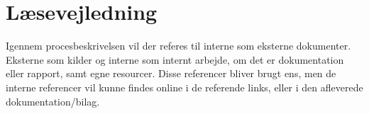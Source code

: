 \section{Læsevejledning}

Igennem procesbeskrivelsen vil der referes til interne som eksterne dokumenter. Eksterne som kilder og interne som internt arbejde, om det er dokumentation eller rapport, samt egne resourcer. Disse referencer bliver brugt ens, men de interne referencer vil kunne findes online i de referende links, eller i den afleverede dokumentation/bilag.